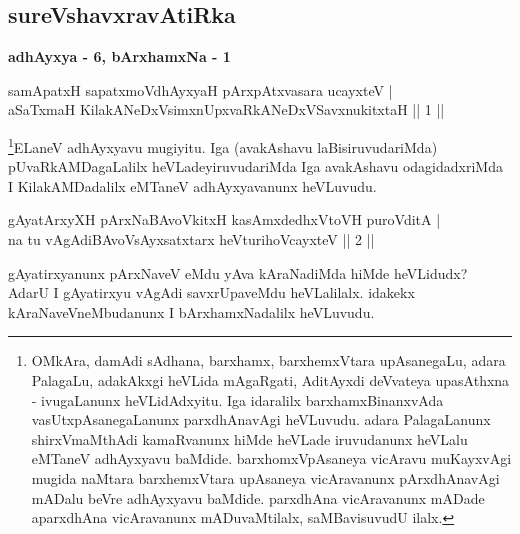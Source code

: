 \begin{center}
\section*{sureVshavxravAtiRka}
{\Large\textbf{adhAyxya - 6,   bArxhamxNa - 1}}
\medskip
\end{center}

\begin{shl}
samApatxH sapatxmoV\s dhAyxyaH pArxpAtxvasara ucayxteV | \\
aSaTxmaH KilakANeDxV\s simxnUpxvaRkANeDxVSavxnukitxtaH \hfill|| 1 || 
\end{shl}

\begin{artha} 
\footnote[1]{OMkAra, damAdi sAdhana, barxhamx, barxhemxVtara 
upAsanegaLu, adara PalagaLu, adakAkxgi heVLida mAgaRgati, AditAyxdi 
deVvateya upasAthxna - ivugaLanunx heVLidAdxyitu. Iga idaralilx 
barxhamxBinanxvAda vasUtxpAsanegaLanunx parxdhAnavAgi heVLuvudu. adara 
PalagaLanunx shirxVmaMthAdi kamaRvanunx hiMde heVLade iruvudanunx heVLalu 
eMTaneV adhAyxyavu baMdide. barxhomxVpAsaneya vicAravu muKayxvAgi 
mugida naMtara barxhemxVtara upAsaneya vicAravanunx pArxdhAnavAgi 
mADalu beVre adhAyxyavu baMdide. parxdhAna vicAravanunx mADade 
aparxdhAna vicAravanunx mADuvaMtilalx, saMBavisuvudU ilalx.}ELaneV adhAyxyavu mugiyitu. Iga (avakAshavu 
laBisiruvudariMda) pUvaRkAMDagaLalilx heVLadeyiruvudariMda Iga 
avakAshavu odagidadxriMda I KilakAMDadalilx eMTaneV adhAyxyavanunx 
heVLuvudu.
\end{artha}


\begin{shl}
gAyatArxyXH pArxNaBAvoVkitxH kasAmxdedhxVtoVH puroVditA | \\
na tu vAgAdiBAvoV\s sAyxsatxtarx heVturihoVcayxteV \hfill|| 2 || 
\end{shl}

\begin{artha} 
gAyatirxyanunx pArxNaveV eMdu yAva kAraNadiMda hiMde heVLidudx? AdarU 
I gAyatirxyu vAgAdi savxrUpaveMdu heVLalilalx. idakekx 
kAraNaveVneMbudanunx I bArxhamxNadalilx heVLuvudu.
\end{artha}

